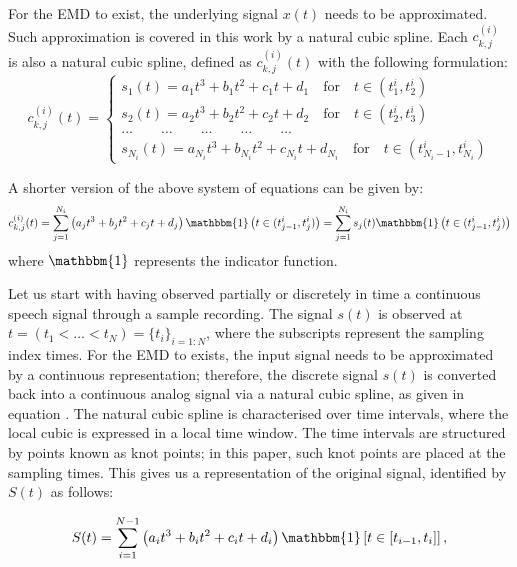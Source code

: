 For the EMD to exist, the underlying signal $x(t)$ needs to be approximated. Such approximation is covered in this work by a natural cubic spline. Each $c_{k,j}^{(i)}$  is also a natural cubic spline, defined as $c_{k,j}^{(i)}(t)$ with the following formulation:
\begin{equation*}
c_{k,j}^{(i)}(t) = \begin{cases}
s_1(t) = a_1 t^3 + b_1 t^2 + c_1 t + d_1 \quad \mbox{for} \quad t \in (t_1^i, t_2^i) \\
s_2(t) = a_2 t^3 + b_2 t^2 + c_2 t + d_2 \quad \mbox{for} \quad t \in (t_2^i, t_3^i)\\
\dots \quad \quad \dots \quad \quad \dots \quad \quad \dots \quad \quad \dots\\
s_{N_i}(t) = a_{N_i} t^3 + b_{N_i} t^2 + c_{N_i} t + d_{N_i} \quad \mbox{for} \quad t \in (t_{{N_i}-1}^i, t_{N_i}^i)
\end{cases}
\end{equation*}

A shorter version of the above system of equations can be given by:
\begin{equation}
c_{k,j}^{(i)}(t) = \sum_{j = 1}^{N_i} \left( a_j t^3 + b_j t^2 + c_j t + d_j \right){\mathbbm{1}} \left( t \in (t_{j-1}^i, t_j^i) \right) = \sum_{j = 1}^{N_i} s_j (t) {\mathbbm{1}} \left( t \in (t_{j-1}^i, t_j^i) \right) 
\end{equation}
where $\mathbbm{1}$ represents the indicator function.

Let us start with having observed partially or discretely in time a continuous speech signal through a sample recording. The signal $s(t)$ is observed at $t =( t_1 < \dots <t_N ) = \{ t_i \}_{i=1:N}$, where the subscripts represent the sampling index times. For the EMD to exists, the input signal needs to be approximated by a continuous representation; therefore, the discrete signal $s(t)$ is converted back into a continuous analog signal via a natural cubic spline, as given in equation \label{cubic_spl}. The natural cubic spline is characterised over time intervals, where the local cubic is expressed in a local time window. The time intervals are structured by points known as knot points; in this paper, such knot points are placed at the sampling times. This gives us a representation of the original signal, identified by $S(t)$ as follows:

\begin{equation}
\label{cubic_spl}
S(t) = \sum_{i=1}^{N-1} \left(a_i t^3 +b_i t^2 + c_i t +d_i \right) \mathbbm{1} \left[ t \in \left[ t_{i-1},t_i \right] \right],
\end{equation} 

